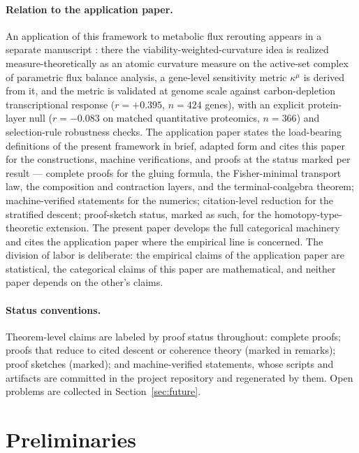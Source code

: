 \documentclass[11pt,a4paper]{article}
\theoremstyle{plain}
\theoremstyle{definition}
\theoremstyle{remark}
\begin{document}
\paragraph{Relation to the application paper.}
An application of this framework to metabolic flux rerouting appears
in a separate manuscript \citep{zai2026measure}: there the
viability-weighted-curvature idea is realized measure-theoretically
as an atomic curvature measure on the active-set complex of
parametric flux balance analysis, a gene-level sensitivity metric
$\kappa^{\mu}$ is derived from it, and the metric is validated at
genome scale against carbon-depletion transcriptional response
($r = +0.395$, $n = 424$ genes), with an explicit protein-layer null
($r = -0.083$ on matched quantitative proteomics, $n = 366$) and
selection-rule robustness checks. The application paper states the load-bearing definitions
of the present framework in brief, adapted form and cites this
paper for the constructions, machine verifications, and proofs at
the status marked per result --- complete proofs for the gluing
formula, the Fisher-minimal transport law, the composition and
contraction layers, and the terminal-coalgebra theorem;
machine-verified statements for the numerics; citation-level
reduction for the stratified descent; proof-sketch status, marked
as such, for the homotopy-type-theoretic extension. The present
paper develops the full categorical machinery and cites the
application paper where the empirical line is concerned. The division of labor is
deliberate: the empirical claims of the application paper are
statistical, the categorical claims of this
paper are mathematical, and neither paper depends on the other's
claims.

\paragraph{Status conventions.}
Theorem-level claims are labeled by proof status throughout:
complete proofs; proofs that reduce to cited descent or coherence
theory (marked in remarks); proof sketches (marked); and
machine-verified statements, whose scripts and artifacts are
committed in the project repository and regenerated by them. Open
problems are collected in Section~\ref{sec:future}.

\section{Preliminaries}\label{sec:prelim}
\end{document}
